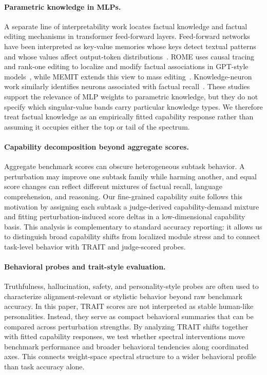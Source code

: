 \paragraph{Parametric knowledge in MLPs.}
A separate line of interpretability work locates factual knowledge and factual editing mechanisms in transformer feed-forward layers. Feed-forward networks have been interpreted as key-value memories whose keys detect textual patterns and whose values affect output-token distributions~\citep{geva_kv_memory}. ROME uses causal tracing and rank-one editing to localize and modify factual associations in GPT-style models~\citep{rome}, while MEMIT extends this view to mass editing~\citep{memit}. Knowledge-neuron work similarly identifies neurons associated with factual recall~\citep{knowledge_neurons}. These studies support the relevance of MLP weights to parametric knowledge, but they do not specify which singular-value bands carry particular knowledge types. We therefore treat factual knowledge as an empirically fitted capability response rather than assuming it occupies either the top or tail of the spectrum.

\paragraph{Capability decomposition beyond aggregate scores.}
Aggregate benchmark scores can obscure heterogeneous subtask behavior. A perturbation may improve one subtask family while harming another, and equal score changes can reflect different mixtures of factual recall, language comprehension, and reasoning. Our fine-grained capability suite follows this motivation by assigning each subtask a judge-derived capability-demand mixture and fitting perturbation-induced score deltas in a low-dimensional capability basis. This analysis is complementary to standard accuracy reporting: it allows us to distinguish broad capability shifts from localized module stress and to connect task-level behavior with TRAIT and judge-scored probes.

\paragraph{Behavioral probes and trait-style evaluation.}
Truthfulness, hallucination, safety, and personality-style probes are often used to characterize alignment-relevant or stylistic behavior beyond raw benchmark accuracy. In this paper, TRAIT scores are not interpreted as stable human-like personalities. Instead, they serve as compact behavioral summaries that can be compared across perturbation strengths. By analyzing TRAIT shifts together with fitted capability responses, we test whether spectral interventions move benchmark performance and broader behavioral tendencies along coordinated axes. This connects weight-space spectral structure to a wider behavioral profile than task accuracy alone.
